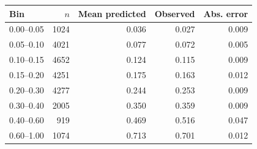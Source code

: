 \begin{tabular}{lrrrr}
\toprule
Bin & $n$ & Mean predicted & Observed & Abs. error \\
\midrule
0.00--0.05 & 1024 & 0.036 & 0.027 & 0.009 \\
0.05--0.10 & 4021 & 0.077 & 0.072 & 0.005 \\
0.10--0.15 & 4652 & 0.124 & 0.115 & 0.009 \\
0.15--0.20 & 4251 & 0.175 & 0.163 & 0.012 \\
0.20--0.30 & 4277 & 0.244 & 0.253 & 0.009 \\
0.30--0.40 & 2005 & 0.350 & 0.359 & 0.009 \\
0.40--0.60 & 919 & 0.469 & 0.516 & 0.047 \\
0.60--1.00 & 1074 & 0.713 & 0.701 & 0.012 \\
\bottomrule
\end{tabular}
